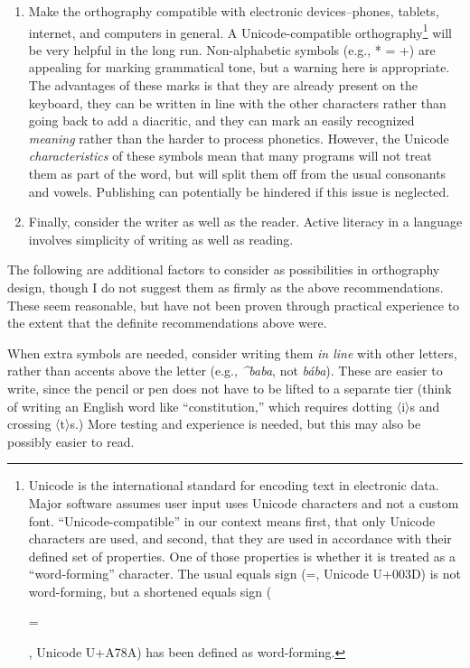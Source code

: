 \documentclass[output=paper]{langscibook}
\begin{document}
\begin{enumerate}
\item Make the orthography compatible with electronic devices–phones, tablets, internet, and computers in general. A Unicode-compatible orthography\footnote{Unicode is the international standard for encoding text in electronic data. Major software assumes user input uses Unicode characters and not a custom font. “Unicode-compatible” in our context means first, that only Unicode characters are used, and second, that they are used in accordance with their defined set of properties. One of those properties is whether it is treated as a “word-forming” character. The usual equals sign (=, Unicode U+003D) is not word-forming, but a shortened equals sign ({\scriptsize = \par} , Unicode U+A78A) has been defined as word-forming.}  will be very helpful in the long run. Non-alphabetic symbols (e.g., * = +) are appealing for marking grammatical tone, but a warning here is appropriate. The advantages of these marks is that they are already present on the keyboard, they can be written in line with the other characters rather than going back to add a diacritic, and they can mark an easily recognized \textit{meaning} rather than the harder to process phonetics. However, the Unicode \textit{characteristics} of these symbols mean that many programs will not treat them as part of the word, but will split them off from the usual consonants and vowels. Publishing can potentially be hindered if this issue is neglected.

\item Finally, consider the writer as well as the reader. Active literacy in a language involves simplicity of writing as well as reading.

\end{enumerate}
The following are additional factors to consider as possibilities in orthography design, though I do not suggest them as firmly as the above recommendations. These seem reasonable, but have not been proven through practical experience to the extent that the definite recommendations above were.

When extra symbols are needed, consider writing them \textit{in line} with other letters, rather than accents above the letter (e.g., \textit{\^{}}\textit{baba}, not \textit{bába}). These are easier to write, since the pencil or pen does not have to be lifted to a separate tier (think of writing an English word like “constitution,” which requires dotting 〈i〉s and crossing 〈t〉s.) More testing and experience is needed, but this may also be possibly easier to read.
\end{document}
